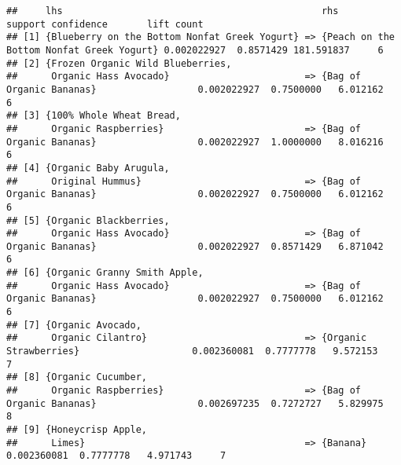 \documentclass[]{article}
\begin{document}
\begin{verbatim}
##     lhs                                              rhs                                           support confidence       lift count
## [1] {Blueberry on the Bottom Nonfat Greek Yogurt} => {Peach on the Bottom Nonfat Greek Yogurt} 0.002022927  0.8571429 181.591837     6
## [2] {Frozen Organic Wild Blueberries,                                                                                                 
##      Organic Hass Avocado}                        => {Bag of Organic Bananas}                  0.002022927  0.7500000   6.012162     6
## [3] {100% Whole Wheat Bread,                                                                                                          
##      Organic Raspberries}                         => {Bag of Organic Bananas}                  0.002022927  1.0000000   8.016216     6
## [4] {Organic Baby Arugula,                                                                                                            
##      Original Hummus}                             => {Bag of Organic Bananas}                  0.002022927  0.7500000   6.012162     6
## [5] {Organic Blackberries,                                                                                                            
##      Organic Hass Avocado}                        => {Bag of Organic Bananas}                  0.002022927  0.8571429   6.871042     6
## [6] {Organic Granny Smith Apple,                                                                                                      
##      Organic Hass Avocado}                        => {Bag of Organic Bananas}                  0.002022927  0.7500000   6.012162     6
## [7] {Organic Avocado,                                                                                                                 
##      Organic Cilantro}                            => {Organic Strawberries}                    0.002360081  0.7777778   9.572153     7
## [8] {Organic Cucumber,                                                                                                                
##      Organic Raspberries}                         => {Bag of Organic Bananas}                  0.002697235  0.7272727   5.829975     8
## [9] {Honeycrisp Apple,                                                                                                                
##      Limes}                                       => {Banana}                                  0.002360081  0.7777778   4.971743     7
\end{verbatim}
\end{document}
